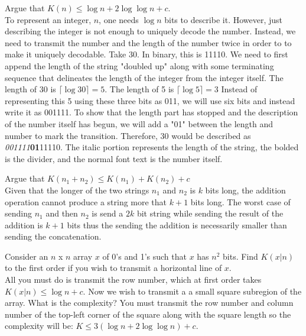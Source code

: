 \documentclass[11pt]{article}
\theoremstyle{definition}
\begin{document}
\example Argue that $K(n) \leq \log{n} + 2 \log{\log{n}} + c$.\\
To represent an integer, $n$, one needs $\log n$ bits to describe it. However, just describing the integer is not enough to uniquely decode the number. Instead, we need to transmit the number and the length of the number twice in order to to make it uniquely decodable. Take 30. In binary, this is 11110. We need to first append the length of the string "doubled up" along with some terminating sequence that delineates the length of the integer from the integer itself. The length of 30 is $\lceil{\log{30}}\rceil = 5$. The length of 5 is $\lceil{\log{5}}\rceil = 3$ Instead of representing this 5 using these three bits as 011, we will use six bits and instead write it as 001111. To show that the length part has stopped and the description of the number itself has begun, we will add a "01" between the length and number to mark the transition. Therefore, 30 would be described as {\it001111}{\bf 01}11110. The italic portion represents the length of the string, the bolded is the divider, and the normal font text is the number itself. 

\example Argue that $K(n_1 + n_2) \leq K(n_1) + K(n_2) + c$\\
Given that the longer of the two strings $n_1$ and $n_2$ is $k$ bits long, the addition operation cannot produce a string more that $k + 1$ bits long. The worst case of sending $n_1$ and then $n_2$ is send a $2k$ bit string while sending the result of the addition is $k + 1$ bits thus the sending the addition is necessarily smaller than sending the concatenation. 

\example Consider an $n$ x $n$ array $x$ of 0's and 1's such that $x$ has $n^2$ bits. Find $K(x|n)$ to the first order if you wish to transmit a horizontal line of $x$.\\
All you must do is transmit the row number, which at first order takes $K(x|n) \leq \log n + c$.
\example Now we wish to transmit a a small square subregion of the array. What is the complexity?
You must transmit the row number and column number of the top-left corner of the square along with the square length so the complexity will be:  $K \leq 3(\log{n} + 2 \log{\log{n}}) + c$.

\newpage
\end{document}
